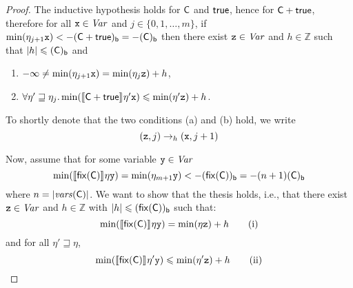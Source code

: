 \begin{proof}
  The inductive hypothesis holds for \(\com\) and \(\tru\), hence for
  \(\com \ndet \tru\), therefore for all \(\var \in \Var\) and
  \(j \in \{0,1, \ldots, m\}\), if
  \(\min(\eta_{j+1} \var) < -\lbound{\com\ndet \tru} = -\lbound{\com}\)
  then there exist \(\var[z] \in \Var\) and \(h \in \mathbb{Z}\) such
  that \(|h| \leq \lbound{\com}\) and
  \begin{enumerate}[label=(\alph*)]
  \item \(-\infty \neq \min(\eta_{j+1} \var) = \min(\eta_j \var[z]) + h\),
  \item \(\forall \eta' \sqsupseteq \eta_j.
    \min(\semi{\com \ndet \tru}\eta'\var) \leq \min(\eta' \var[z]) + h\).
  \end{enumerate}
  To shortly denote that the two conditions (a) and (b) hold, we write
  \[
  (\var[z],j) \to_{h} (\var, j+1)
  \]
  
  Now, assume that for some variable \(\var[y] \in \Var\)
  \[\min(\semi{\fix{\com}} \eta \var[y]) = \min(\eta_{m+1} \var[y]) <
    - \lbound{\fix{\com}} = - (n+1) \lbound{\com}\] where
  \(n=|\mathit{vars}(\com)|\).  We want to show that the thesis holds,
  i.e., that there exist \(\var[z] \in \Var\) and \(h \in \mathbb{Z}\)
  with \(|h| \leq \lbound{\fix{\com}}\) such that:
  \begin{equation}\label{eq:maxendmaxstartmin}
    \min(\semi{\fix{\com}} \eta \var[y]) = \min(\eta \var[z]) + h
    \tag{i}
  \end{equation}
  and for all \(\eta' \sqsupseteq \eta\),
  \begin{equation}\label{eq:maxmiddlemaxendmin}
    \min(\semi{\fix{\com}} \eta' \var[y]) \leq \min(\eta' \var[z]) + h
    \tag{ii}
  \end{equation}
  

\end{proof}
